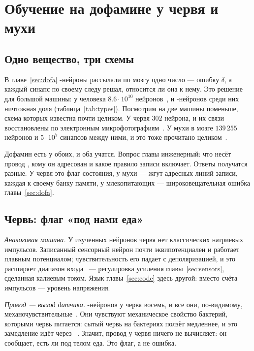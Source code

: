 \chapter{Обучение на дофамине у червя и мухи}
\label{sec:wormfly}

\section{Одно вещество, три схемы}

В главе~\ref{sec:dofa} -нейроны рассылали по мозгу одно число --- ошибку $\delta$, а каждый синапс по своему следу решал, относится ли она к нему. Это решение для большой машины: у человека $8.6\cdot10^{10}$ нейронов~\cite{Azevedo2009}, и -нейронов среди них ничтожная доля (таблица~\ref{tab:types}). Посмотрим на две машины поменьше, схема которых известна почти целиком. У червя $302$ нейрона, и их связи восстановлены по электронным микрофотографиям~\cite{White1986,Cook2019}. У мухи в мозге $139\,255$ нейронов и $5\cdot10^7$ синапсов между ними, и это тоже прочитано целиком~\cite{Dorkenwald2024}.

Дофамин есть у обоих, и оба учатся. Вопрос главы инженерный: что несёт провод , кому он адресован и какое правило записи включает. Ответы получатся разные. У червя это флаг состояния, у мухи --- жгут адресных линий записи, каждая к своему банку памяти, у млекопитающих --- широковещательная ошибка главы~\ref{sec:dofa}.

\section{Червь: флаг «под нами еда»}

\emph{Аналоговая машина.} У изученных нейронов червя нет классических натриевых импульсов. Записанный сенсорный нейрон почти эквипотенциален и работает плавным потенциалом; чувствительность его падает с деполяризацией, и это расширяет диапазон входа~\cite{Goodman1998} --- регулировка усиления главы~\ref{sec:sensors}, сделанная калиевым током. Язык главы~\ref{sec:code} здесь другой: вместо счёта импульсов --- уровень напряжения.

\emph{Провод  --- выход датчика.} -нейронов у червя восемь, и все они, по-видимому, механочувствительные~\cite{Sulston1975}. Они чувствуют механическое свойство бактерий, которыми червь питается: сытый червь на бактериях ползёт медленнее, и это замедление идёт через ~\cite{Sawin2000}. Значит, провод  у червя ничего не вычисляет: он сообщает, есть ли под телом еда. Это флаг, а не ошибка.


